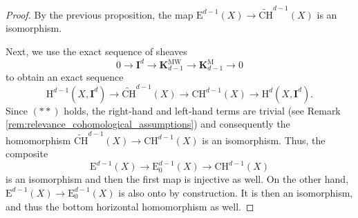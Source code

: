 \documentclass[11pt,leqno]{amsart}
\renewcommand{\1}{{\rm 1\hspace*{-0.4ex}%
\rule{0.1ex}{1.52ex}\hspace*{0.2ex}}}
\newcommand{\CHW}{{\widetilde{\mathrm{CH}}}}
\newcommand{\CH}{{\mathrm{CH}}}
\newcommand{\K}{{{\mathbf K}}}
\newcommand{\KMW}{\K^{\mathrm{MW}}}
\newcommand{\KM}{\K^{\mathrm M}}
\newcommand{\Hr}{{\mathrm {H}}}
\newcommand{\<}[1]{{\langle}#1 {\rangle}}
\newcommand{\Er}{\mathrm{E}}
\theoremstyle{plain}
\theoremstyle{definition}
\theoremstyle{remark}
\numberwithin{equation}{section}
\begin{document}
\begin{proof}
By the previous proposition, the map $\Er^{d-1}(X)\to \CHW^{d-1}(X)$ is an isomorphism. 

Next, we use the exact sequence of sheaves
\[
0\to \mathbf{I}^d\to \KMW_{d-1}\to \KM_{d-1}\to 0
\]
to obtain an exact sequence
\[
\Hr^{d-1}(X,\mathbf{I}^d)\to \CHW^{d-1}(X)\to \CH^{d-1}(X)\to \Hr^{d}(X,\mathbf{I}^d). 
\]
Since $(**)$ holds, the right-hand and left-hand terms are trivial (see Remark \ref{rem:relevance_cohomological_assumptions}) and consequently the homomorphism $\CHW^{d-1}(X)\to \CH^{d-1}(X)$ is an isomorphism. Thus, the composite
\[
\Er^{d-1}(X)\to \Er^{d-1}_0(X)\to \CH^{d-1}(X)
\]
is an isomorphism and then the first map is injective as well.  On the other hand, $\Er^{d-1}(X)\to \Er^{d-1}_0(X)$ is also onto by construction. It is then an isomorphism, and thus the bottom horizontal homomorphism as well.
\end{proof}

{\begin{footnotesize}
\raggedright


\end{footnotesize}}
\end{document}
